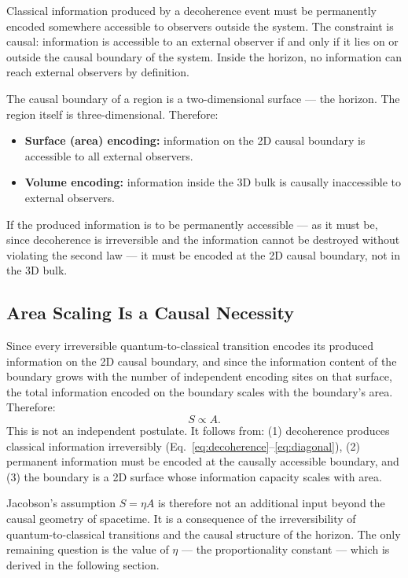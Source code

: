 \documentclass[12pt,a4paper]{article}
\begin{document}
Classical information produced by a decoherence event must be
permanently encoded somewhere accessible to observers outside the
system. The constraint is causal: information is accessible to an
external observer if and only if it lies on or outside the causal
boundary of the system. Inside the horizon, no information can reach
external observers by definition.

The causal boundary of a region is a two-dimensional surface ---
the horizon. The region itself is three-dimensional. Therefore:

\begin{itemize}
\item \textbf{Surface (area) encoding:} information on the
2D causal boundary is accessible to all external observers.
\item \textbf{Volume encoding:} information inside the 3D bulk
is causally inaccessible to external observers.
\end{itemize}

If the produced information is to be permanently accessible --- as
it must be, since decoherence is irreversible and the information
cannot be destroyed without violating the second law --- it must be
encoded at the 2D causal boundary, not in the 3D bulk.

\subsection{Area Scaling Is a Causal Necessity}

Since every irreversible quantum-to-classical transition encodes its
produced information on the 2D causal boundary, and since the
information content of the boundary grows with the number of
independent encoding sites on that surface, the total information
encoded on the boundary scales with the boundary's area. Therefore:
\begin{equation}
S \propto A.
\label{eq:S_propto_A_derived}
\end{equation}
This is not an independent postulate. It follows from:
(1) decoherence produces classical information irreversibly
(Eq.~\ref{eq:decoherence}--\ref{eq:diagonal}),
(2) permanent information must be encoded at the causally accessible
boundary, and
(3) the boundary is a 2D surface whose information capacity scales
with area.

Jacobson's assumption $S = \eta A$ is therefore not an additional
input beyond the causal geometry of spacetime. It is a consequence
of the irreversibility of quantum-to-classical transitions and the
causal structure of the horizon. The only remaining question is
the value of $\eta$ --- the proportionality constant --- which
is derived in the following section.
\end{document}
